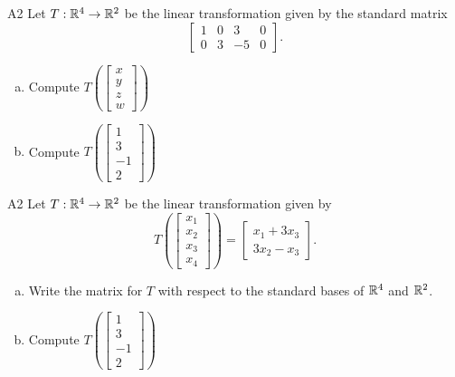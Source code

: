 \begin{problem}{A2}
Let $T: \mathbb{R}^4 \rightarrow \mathbb{R}^2$ be the linear transformation given by the standard matrix 
$$\begin{bmatrix} 1 & 0 & 3 & 0 \\ 0 & 3 & -5 & 0 \end{bmatrix}.$$
\begin{enumerate}[(a)]
\item Compute \( T\left( \begin{bmatrix}x\\ y \\ z \\ w \end{bmatrix} \right) \)
\item Compute \( T\left( \begin{bmatrix} 1 \\ 3 \\ -1 \\ 2\end{bmatrix} \right) \)
\end{enumerate}
\end{problem}
\begin{solution}
\end{solution}

\begin{problem}{A2}
Let $T: \mathbb{R}^4 \rightarrow \mathbb{R}^2$ be the linear transformation given by $$T\left(\begin{bmatrix} x_1 \\ x_2 \\ x_3 \\ x_4 \end{bmatrix} \right) = \begin{bmatrix} x_1+3x_3 \\ 3x_2-x_3 \end{bmatrix}.$$ 
\begin{enumerate}[(a)]
\item Write the matrix for $T$ with respect to the standard bases of $\mathbb{R}^4$ and $\mathbb{R}^2$.
\item Compute \( T\left( \begin{bmatrix} 1 \\ 3 \\ -1 \\ 2 \end{bmatrix} \right) \)
\end{enumerate}
\end{problem}


